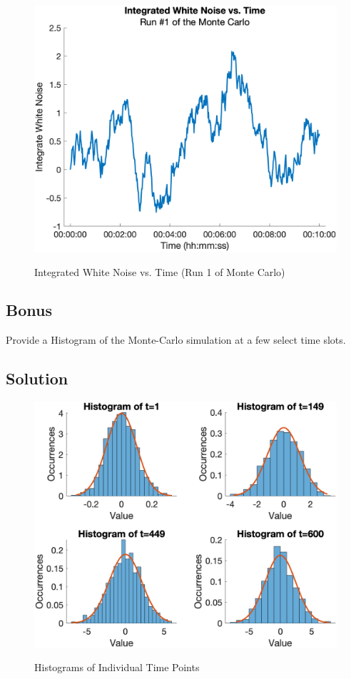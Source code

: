 \documentclass{article}
\begin{document}
\begin{figure}[H]
    \centering
    \includegraphics[width=0.75\linewidth]{../figures/p2_rw_run.png}\label{fig:p2_rw_run}
    \caption{Integrated White Noise vs. Time (Run 1 of Monte Carlo)}
\end{figure}

\subsection*{Bonus}
Provide a Histogram of the Monte-Carlo simulation at a few select time slots.

\subsection*{Solution}
\begin{figure}[H]
    \centering
    \includegraphics[width=0.75\linewidth]{../figures/p2_bonus.png}\label{fig:p2_bonus}
    \caption{Histograms of Individual Time Points}
\end{figure}
\end{document}
